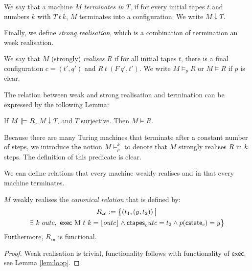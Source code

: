 \documentclass{psartcl}
\renewcommand{\vDash}{\models} \DeclareRobustCommand{\VDash}{\mathrel{|\mkern-2mu|}\joinrel \Relbar}
\newcommand{\MS}[1]{\textsf{#1}}
\newcommand{\setOf}[1]{\bigl \{ #1 \bigr \}}
\newcommand{\setMap}[2]{\setOf{#1 \,\big|\, #2}}
\newcommand{\Some}[1]{\left\lfloor #1\right\rfloor}
\begin{document}
\begin{definition}[Termination]
  \label{def:termination}
  We say that a machine $M$ \emph{terminates in} $T$, if for every initial tapes $t$ and numbers $k$ with $T~t~k$,
  $M$ terminates into a configuration.
  We write $M \downarrow T$.
\end{definition}

Finally, we define \emph{strong realisation}, which is a combination of termination an week realisation.

\begin{definition}
  \label{def:realise}
  We say that $M$ (strongly) \emph{realises} $R$ if for all initial tapes $t$,
  there is a final configuration $c=(t', q')$ and $R~t~(F~q', t')$.
  We write $M \vDash_p R$ or $M \vDash R$ if $p$ is clear.
\end{definition}

The relation between weak and strong realisation and termination can be expressed by the following Lemma:

\begin{lemma}
  \label{lem:wrealise-realise}
  If $M \VDash R$, $M \downarrow T$, and $T$ surjective.  Then $M \vDash R$.
\end{lemma}

Because there are many Turing machines that terminate after a constant number of steps, we introduce the notion $M \vDash_p^k$ to denote that $M$
strongly realises $R$ in $k$ steps.  The definition of this predicate is clear.

We can define relations that every machine weakly realises and in that every machine terminates.

\begin{lemma}
  \label{lem:canonical-relation}
  $M$ weakly realises the \emph{canonical relation} that is defined by:
  \begin{multline*}
    R_{\MS{cn}} := \setMap{(t_1, (y, t_2))}{\\
      \exists~k~outc,~ \MS{exec}~$M$~t~k = \Some{outc} \land \MS{ctapes}_outc = t_2 \land p(\MS{cstate}_c) = y}
    \end{multline*}
    Furthermore, $R_\MS{cn}$ is functional.
\end{lemma}
\begin{proof}
  Weak realisation is trivial, functionality follows with functionality of $\MS{exec}$, see Lemma \ref{lem:loop}.
\end{proof}
\end{document}
